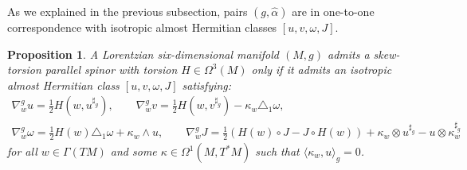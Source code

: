 \documentclass[10pt,a4paper,twoside,reqno]{amsart}
\theoremstyle{plain}
\newtheorem{prop}[thm]{Proposition}
\theoremstyle{definition}
\theoremstyle{remark}
\newcommand{\escal}[1]{\langle#1\rangle}
\begin{document}
As we explained in the previous subsection, pairs $(g,\widehat{\alpha})$ are in one-to-one correspondence with isotropic almost Hermitian classes $[u,v,\omega,J]$.

\begin{prop}
\label{prop:covariant_derivative_(u,v,omega)}
A Lorentzian six-dimensional manifold $(M,g)$ admits a skew-torsion parallel spinor with torsion $H\in\Omega^3(M)$ only if it admits an isotropic almost Hermitian class $[u,v,\omega,J]$ satisfying:
\begin{gather*}
\nabla^g_w u=\frac{1}{2}H(w,u^{\sharp_{g}}),\qquad \nabla^g_w v=\frac{1}{2}H(w,v^{\sharp_g})-\kappa_w\triangle_1\omega,\\
\nabla^g_w\omega=\frac{1}{2}H(w)\triangle_1\omega+\kappa_w\wedge u,\qquad \nabla^g_w J = \frac{1}{2} ( H(w) \circ J - J \circ H(w) ) + \kappa_w\otimes u^{\sharp_g}-u\otimes\kappa_w^{\sharp_g}
\end{gather*}
for all $w\in\Gamma(TM)$ and some $\kappa\in\Omega^1(M,T^*M)$ such that $\escal{\kappa_w,u}_g=0$.
\end{prop}
\end{document}
